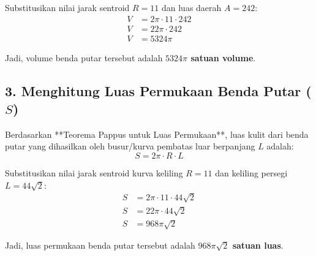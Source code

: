 \documentclass[12pt,a4paper]{article}
\begin{document}
Substitusikan nilai jarak sentroid $R = 11$ dan luas daerah $A = 242$:
\begin{align*}
  V &= 2\pi \cdot 11 \cdot 242 \\
  V &= 22\pi \cdot 242 \\
  V &= 5324\pi
\end{align*}

Jadi, volume benda putar tersebut adalah \textbf{$5324\pi$ satuan volume}.

\subsection*{3. Menghitung Luas Permukaan Benda Putar ($S$)}
Berdasarkan **Teorema Pappus untuk Luas Permukaan**, luas kulit dari benda putar yang dihasilkan oleh busur/kurva pembatas luar berpanjang $L$ adalah:
\begin{equation*}
  S = 2\pi \cdot R \cdot L
\end{equation*}

Substitusikan nilai jarak sentroid kurva keliling $R = 11$ dan keliling persegi $L = 44\sqrt{2}$:
\begin{align*}
  S &= 2\pi \cdot 11 \cdot 44\sqrt{2} \\
  S &= 22\pi \cdot 44\sqrt{2} \\
  S &= 968\pi\sqrt{2}
\end{align*}

Jadi, luas permukaan benda putar tersebut adalah \textbf{$968\pi\sqrt{2}$ satuan luas}.
\end{document}
